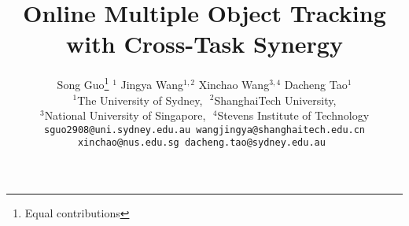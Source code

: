 \documentclass[final]{cvpr}
\begin{document}
\title{Online Multiple Object Tracking with Cross-Task Synergy}




\author{Song Guo\thanks{Equal contributions}  $^1$ 
	\quad \quad Jingya  Wang\footnotemark[1]  $^{1,2}$ 
	\quad \quad Xinchao Wang$^{3,4}$ 
	\quad \quad Dacheng Tao$^1$ \\
$^1$The University of Sydney,\,\,
$^2$ShanghaiTech University,\\
$^3$National University of Singapore,\,\,
$^4$Stevens Institute of Technology\\
\tt\small sguo2908@uni.sydney.edu.au
\quad 
\tt\small wangjingya@shanghaitech.edu.cn
\\
\tt\small xinchao@nus.edu.sg
\quad 
\tt\small dacheng.tao@sydney.edu.au
}

\maketitle
\end{document}
